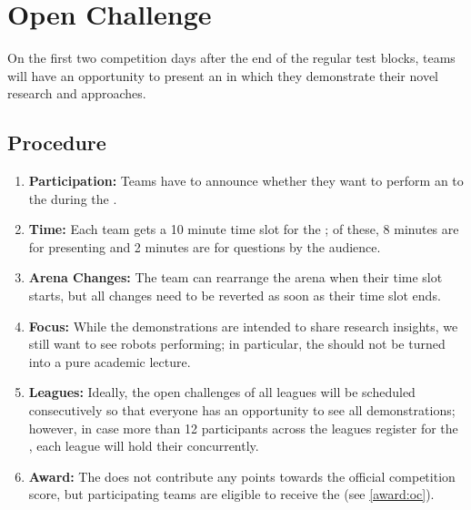 \section{Open Challenge}
\label{sec:rules:openchallenge}

On the first two competition days after the end of the regular test blocks, teams will have an opportunity to present an \OpenChallenge{} in which they demonstrate their novel research and approaches.

\subsection{Procedure}
\label{sec:rules:ocprocedure}
\begin{enumerate}
	\item \textbf{Participation:} Teams have to announce whether they want to perform an \OpenChallenge{} to the  during the \SetupDays{}.
	\item \textbf{Time:} Each team gets a 10 minute time slot for the \OpenChallenge; of these, 8 minutes are for presenting and 2 minutes are for questions by the audience.
	\item \textbf{Arena Changes:} The team can rearrange the arena when their time slot starts, but all changes need to be reverted as soon as their time slot ends.
	\item \textbf{Focus:} While the demonstrations are intended to share research insights, we still want to see robots performing; in particular, the \OpenChallenge{} should not be turned into a pure academic lecture.
	\item \textbf{Leagues:} Ideally, the open challenges of all \AtHome{} leagues will be scheduled consecutively so that everyone has an opportunity to see all demonstrations; however, in case more than 12 participants across the leagues register for the \OpenChallenge, each league will hold their \OpenChallenge{} concurrently.
	\item \textbf{Award:} The \OpenChallenge{} does not contribute any points towards the official competition score, but participating teams are eligible to receive the \OCAward{} (see \ref{award:oc}).
\end{enumerate}

